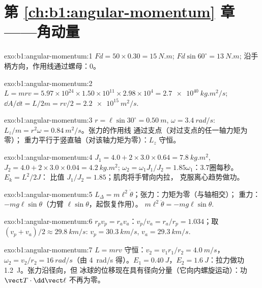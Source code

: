 \section*{第 \ref{ch:b1:angular-momentum} 章——角动量}

\begin{solution}{exo:b1:angular-momentum:1}
$Fd = 50 \times 0.30 = \qty{15}{N.m}$; $Fd\sin 60^\circ = \qty{13}{N.m}$;
沿手柄方向，作用线通过螺母：$0$。
\end{solution}

\begin{solution}{exo:b1:angular-momentum:2}
$L = mrv = 5.97\times10^{24} \times 1.50\times10^{11} \times 2.98\times10^4 =
\qty{2.7e40}{kg.m^2/s}$; $\dd A/\dd t = L/2m = rv/2 = \qty{2.2e15}{m^2/s}$.
\end{solution}

\begin{solution}{exo:b1:angular-momentum:3}
$r = \ell\sin 30^\circ = \qty{0.50}{m}$, $\omega = \qty{3.4}{rad/s}$:
$L_z/m = r^2\omega = \qty{0.84}{m^2/s}$。张力的作用线
通过支点（对过支点的任一轴力矩为零）；
重力平行于竖直轴（对该轴力矩为零）：$L_z$
守恒。
\end{solution}

\begin{solution}{exo:b1:angular-momentum:4}
$J_1 = 4.0 + 2 \times 3.0 \times 0.64 = \qty{7.8}{kg.m^2}$, $J_2 = 4.0 +
2 \times 3.0 \times 0.04 = \qty{4.2}{kg.m^2}$; $\omega_2 = \omega_1J_1/J_2 =
1.85\omega_1$：\qty{3.7}{}圈每秒。$E_k = L^2/2J$：
比值 $J_1/J_2 = 1.85$；肌肉将手臂向内拉，
克服离心趋势做功。
\end{solution}

\begin{solution}{exo:b1:angular-momentum:5}
$L_\Delta = m\ell^2\dot\theta$；张力：力矩为零（与轴相交）；
重力：$-mg\ell\sin\theta$（力臂 $\ell\sin\theta$，起恢复作用）。
$m\ell^2\ddot\theta = -mg\ell\sin\theta$.
\end{solution}

\begin{solution}{exo:b1:angular-momentum:6}
$r_pv_p = r_av_a$：$v_p/v_a = r_a/r_p = 1.034$；取 $(v_p + v_a)/2 \approx
\qty{29.8}{km/s}$: $v_p = \qty{30.3}{km/s}$, $v_a = \qty{29.3}{km/s}$.
\end{solution}

\begin{solution}{exo:b1:angular-momentum:7}
$L = mrv$ 守恒：$v_2 = v_1r_1/r_2 = \qty{4.0}{m/s}$，$\omega_2 = v_2/r_2
= \qty{16}{rad/s}$（由 \qty{4}{rad/s} 得）。$E_1 = \qty{0.40}{J}$，$E_2 =
\qty{1.6}{J}$：拉力做功 \qty{1.2}{J}。张力沿径向，但
冰球的位移现在具有径向分量（它向内螺旋运动）：功
$\vect T\cdot\dd\vect\ell$ 不再为零。
\end{solution}

